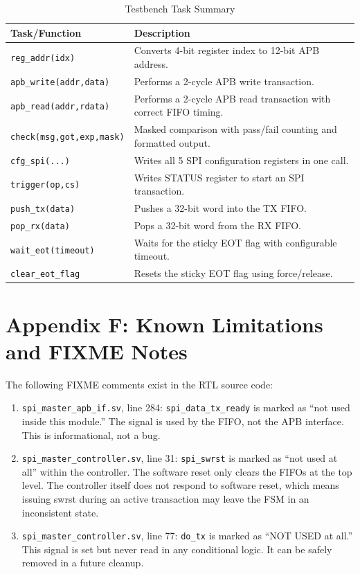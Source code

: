 \begin{table}[H]
\centering
\caption{Testbench Task Summary}
\label{tab:task_ref}
\small
\begin{tabularx}{\textwidth}{@{}lX@{}}
\toprule
\textbf{Task/Function} & \textbf{Description} \\
\midrule
\texttt{reg\_addr(idx)}        & Converts 4-bit register index to 12-bit APB address. \\
\texttt{apb\_write(addr,data)} & Performs a 2-cycle APB write transaction. \\
\texttt{apb\_read(addr,rdata)} & Performs a 2-cycle APB read transaction with correct FIFO timing. \\
\texttt{check(msg,got,exp,mask)} & Masked comparison with pass/fail counting and formatted output. \\
\texttt{cfg\_spi(...)}         & Writes all 5 SPI configuration registers in one call. \\
\texttt{trigger(op,cs)}       & Writes STATUS register to start an SPI transaction. \\
\texttt{push\_tx(data)}       & Pushes a 32-bit word into the TX FIFO. \\
\texttt{pop\_rx(data)}        & Pops a 32-bit word from the RX FIFO. \\
\texttt{wait\_eot(timeout)}   & Waits for the sticky EOT flag with configurable timeout. \\
\texttt{clear\_eot\_flag}     & Resets the sticky EOT flag using force/release. \\
\bottomrule
\end{tabularx}
\end{table}

\section{Appendix F: Known Limitations and FIXME Notes}

The following FIXME comments exist in the RTL source code:

\begin{enumerate}[leftmargin=2em]
  \item \texttt{spi\_master\_apb\_if.sv}, line 284: \texttt{spi\_data\_tx\_ready} is marked as
        ``not used inside this module.'' The signal is used by the FIFO, not the APB interface.
        This is informational, not a bug.
  \item \texttt{spi\_master\_controller.sv}, line 31: \texttt{spi\_swrst} is marked as ``not used
        at all'' within the controller. The software reset only clears the FIFOs at the top level.
        The controller itself does not respond to software reset, which means issuing swrst during
        an active transaction may leave the FSM in an inconsistent state.
  \item \texttt{spi\_master\_controller.sv}, line 77: \texttt{do\_tx} is marked as ``NOT USED
        at all.'' This signal is set but never read in any conditional logic. It can be safely
        removed in a future cleanup.
\end{enumerate}


